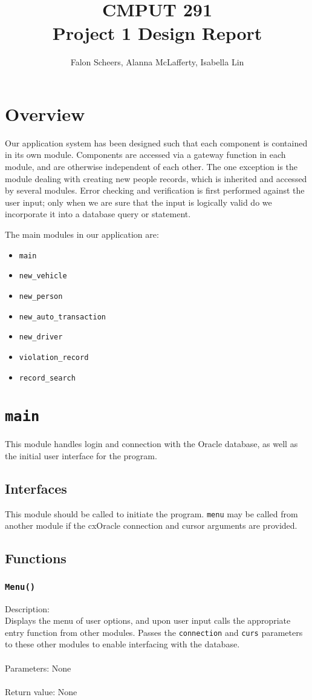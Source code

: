 \documentclass[12pt]{article}
\title{CMPUT 291 \\ Project 1 Design Report}
\author{Falon Scheers, Alanna McLafferty, Isabella Lin}
\begin{document}
\maketitle
\newpage
\tableofcontents
\newpage
\section{Overview}
Our application system has been designed such that each component is contained in its own module. Components are accessed via a gateway function in each module, and are otherwise independent of each other. The one exception is the module dealing with creating new people records, which is inherited and accessed by several modules. Error checking and verification is first performed against the user input; only when we are sure that the input is logically valid do we incorporate it into a database query or statement.


The main modules in our application are:
\begin{itemize}
\item \texttt{main}
\item \texttt{new\_vehicle}
\item \texttt{new\_person}
\item \texttt{new\_auto\_transaction}
\item \texttt{new\_driver}
\item \texttt{violation\_record}
\item \texttt{record\_search}
\end{itemize}

\newpage
\section{\texttt{main}}

This module handles login and connection with the Oracle database, as well as the initial user interface for the program.
\subsection{Interfaces}
This module should be called to initiate the program. \texttt{menu} may be called from another module if the cxOracle connection and cursor arguments are provided.

\subsection{Functions}
\subsubsection{\texttt{Menu()}}
Description: \\
\indent Displays the menu of user options, and upon user input calls the appropriate entry function from other modules. Passes the \texttt{connection} and \texttt{curs} parameters to these other modules to enable interfacing with the database.\\\\
Parameters: None\\\\
Return value: None
\end{document}
